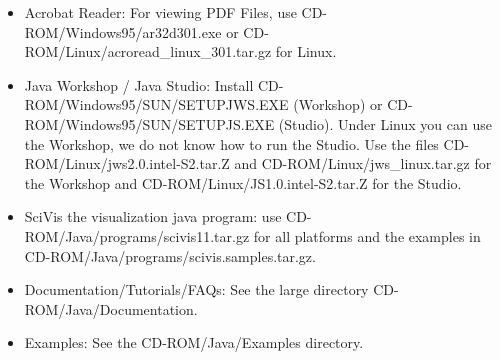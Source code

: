 \documentclass[a4paper,12pt]{article}
\begin{document}
\begin{itemize}
\item Acrobat Reader: For viewing PDF Files, use CD-ROM/Windows95/ar32d301.exe
  or CD-ROM/Linux/acroread\_linux\_301.tar.gz for Linux.
\item Java Workshop / Java Studio: Install CD-ROM/Windows95/SUN/SETUPJWS.EXE 
  (Workshop) or CD-ROM/Windows95/SUN/SETUPJS.EXE (Studio). Under Linux
  you can use the Workshop, we do not know how to run the Studio.
  Use the files CD-ROM/Linux/jws2.0.intel-S2.tar.Z and
  CD-ROM/Linux/jws\_linux.tar.gz for the Workshop and
  CD-ROM/Linux/JS1.0.intel-S2.tar.Z for the Studio.
\item SciVis the visualization java program: use
  CD-ROM/Java/programs/scivis11.tar.gz for all platforms and the examples
  in CD-ROM/Java/programs/scivis.samples.tar.gz.
\item Documentation/Tutorials/FAQs: See the large directory 
  CD-ROM/Java/Documentation.
\item Examples: See the CD-ROM/Java/Examples directory.
\end{itemize}
\end{document}
